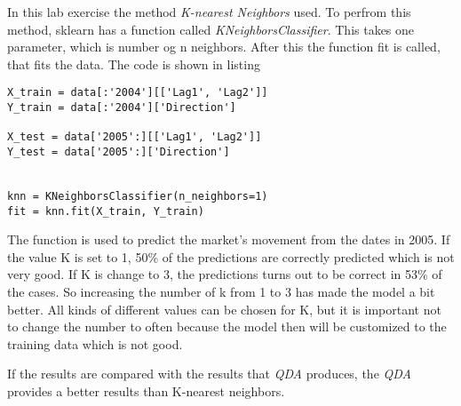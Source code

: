 In this lab exercise the method \emph{K-nearest Neighbors} used. To perfrom this method, sklearn has a function called \emph{KNeighborsClassifier}. This takes one parameter, which is number og n neighbors. After this the function fit is called, that fits the data.
The code is shown in listing

\begin{lstlisting}[caption={Python K-Nearest neighbors function, where K is set to 1}, label=lst:kneighbor, mathescape=true]
X_train = data[:'2004'][['Lag1', 'Lag2']]
Y_train = data[:'2004']['Direction']

X_test = data['2005':][['Lag1', 'Lag2']]
Y_test = data['2005':]['Direction']


knn = KNeighborsClassifier(n_neighbors=1)
fit = knn.fit(X_train, Y_train)
\end{lstlisting}

The function is used to predict the market's movement from the dates in 2005. If the value K is set to 1, 50\% of the predictions are correctly predicted which is not very good.
If K is change to 3, the predictions turns out to be correct in 53\% of the cases. So increasing the number of k from 1 to 3 has made the model a bit better. All kinds of different values can be chosen for K, but it is important not to change the number to often because the model then will be customized to the training data which is not good.

If the results are compared with the results that \emph{QDA} produces, the \emph{QDA} provides a better results than K-nearest neighbors.